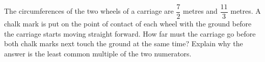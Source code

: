 The circumferences of the two wheels of a carriage are $\dfrac{7}{2}$ metres and $\dfrac{11}{3}$ metres. A chalk mark is put on the point of contact of each wheel with the ground before the carriage starts moving straight forward. How far must the carriage go before both chalk marks next touch the ground at the same time? Explain why the answer is the least common multiple of the two numerators.
